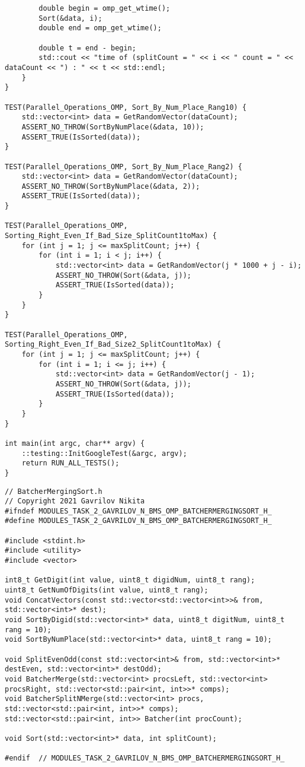 \documentclass{report}
\begin{document}
\begin{lstlisting}
        double begin = omp_get_wtime();
        Sort(&data, i);
        double end = omp_get_wtime();

        double t = end - begin;
        std::cout << "time of (splitCount = " << i << " count = " << dataCount << ") : " << t << std::endl;
    }
}

TEST(Parallel_Operations_OMP, Sort_By_Num_Place_Rang10) {
    std::vector<int> data = GetRandomVector(dataCount);
    ASSERT_NO_THROW(SortByNumPlace(&data, 10));
    ASSERT_TRUE(IsSorted(data));
}

TEST(Parallel_Operations_OMP, Sort_By_Num_Place_Rang2) {
    std::vector<int> data = GetRandomVector(dataCount);
    ASSERT_NO_THROW(SortByNumPlace(&data, 2));
    ASSERT_TRUE(IsSorted(data));
}

TEST(Parallel_Operations_OMP, Sorting_Right_Even_If_Bad_Size_SplitCount1toMax) {
    for (int j = 1; j <= maxSplitCount; j++) {
        for (int i = 1; i < j; i++) {
            std::vector<int> data = GetRandomVector(j * 1000 + j - i);
            ASSERT_NO_THROW(Sort(&data, j));
            ASSERT_TRUE(IsSorted(data));
        }
    }
}

TEST(Parallel_Operations_OMP, Sorting_Right_Even_If_Bad_Size2_SplitCount1toMax) {
    for (int j = 1; j <= maxSplitCount; j++) {
        for (int i = 1; i <= j; i++) {
            std::vector<int> data = GetRandomVector(j - 1);
            ASSERT_NO_THROW(Sort(&data, j));
            ASSERT_TRUE(IsSorted(data));
        }
    }
}

int main(int argc, char** argv) {
    ::testing::InitGoogleTest(&argc, argv);
    return RUN_ALL_TESTS();
}
\end{lstlisting}
\begin{lstlisting}
// BatcherMergingSort.h
// Copyright 2021 Gavrilov Nikita
#ifndef MODULES_TASK_2_GAVRILOV_N_BMS_OMP_BATCHERMERGINGSORT_H_
#define MODULES_TASK_2_GAVRILOV_N_BMS_OMP_BATCHERMERGINGSORT_H_

#include <stdint.h>
#include <utility>
#include <vector>

int8_t GetDigit(int value, uint8_t digidNum, uint8_t rang);
uint8_t GetNumOfDigits(int value, uint8_t rang);
void ConcatVectors(const std::vector<std::vector<int>>& from, std::vector<int>* dest);
void SortByDigid(std::vector<int>* data, uint8_t digitNum, uint8_t rang = 10);
void SortByNumPlace(std::vector<int>* data, uint8_t rang = 10);

void SplitEvenOdd(const std::vector<int>& from, std::vector<int>* destEven, std::vector<int>* destOdd);
void BatcherMerge(std::vector<int> procsLeft, std::vector<int> procsRight, std::vector<std::pair<int, int>>* comps);
void BatcherSplitNMerge(std::vector<int> procs, std::vector<std::pair<int, int>>* comps);
std::vector<std::pair<int, int>> Batcher(int procCount);

void Sort(std::vector<int>* data, int splitCount);

#endif  // MODULES_TASK_2_GAVRILOV_N_BMS_OMP_BATCHERMERGINGSORT_H_
\end{lstlisting}
\end{document}
